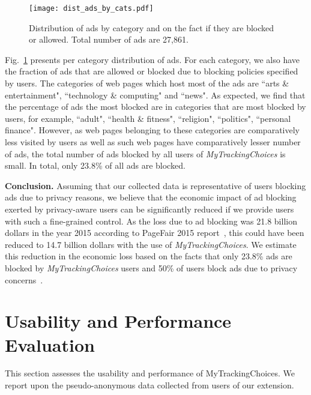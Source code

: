 \documentclass[conference]{IEEEtran}
\begin{document}
\begin{figure}[t]
\centering
\texttt{[image: dist\_ads\_by\_cats.pdf]}
\caption{Distribution of ads by category and on the fact if they are blocked or allowed. Total number of ads are 27,861.}
\label{fig:dist_ads_by_cats}
\end{figure}
Fig.~\ref{fig:dist_ads_by_cats} presents per category distribution of ads.
For each category, we also have the fraction of ads that are allowed or blocked due to blocking policies specified by users.
The categories of web pages which host most of the ads are ``arts \& entertainment", ``technology \& computing" and ``news".
As expected, we find that the percentage of ads the most blocked are in categories that are most blocked by users, for example, ``adult", ``health \& fitness", ``religion", ``politics", ``personal finance".
However, as web pages belonging to these categories are comparatively less visited by users as well as such web pages have comparatively lesser number of ads, the total number of ads blocked by all users of \emph{MyTrackingChoices} is small.
In total, only 23.8\% of all ads are blocked.




\textbf{Conclusion.}
Assuming that our collected data is representative of users blocking ads due to privacy reasons, 
we believe that the economic impact of ad blocking exerted by privacy-aware users can be significantly reduced if we provide users with such a fine-grained control.
As the loss due to ad blocking was 21.8 billion dollars in the year 2015 according to PageFair 2015 report~\cite{pagefaire_report_2015}, this could have been reduced to 14.7 billion dollars with the use of \emph{MyTrackingChoices}.
We estimate this reduction in the economic loss based on the facts that only 23.8\% ads are blocked by \emph{MyTrackingChoices} users and 50\% of users block ads due to privacy concerns~\cite{pagefaire_report_2015}.


 















\section{Usability and Performance Evaluation}
\label{sec:usability_performance}
This section assesses the usability and performance of MyTrackingChoices.
We report upon the pseudo-anonymous data collected from users of our extension.
\end{document}
